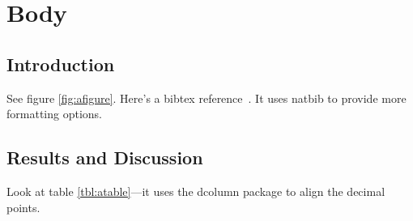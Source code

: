 \chapter{Body}
\section{\label{sec:intro}Introduction}
\par See figure \ref{fig:afigure}. Here's a bibtex reference~\cite{hohenberg:B864}. It uses natbib to provide more formatting options.

\par\lipsum
\section{\label{sec:results}Results and Discussion}
Look at table \ref{tbl:atable}---it uses the dcolumn package to align the decimal points.

\par\lipsum
